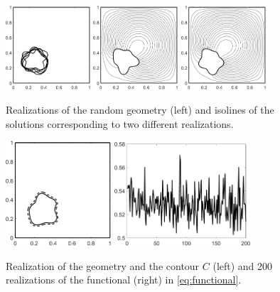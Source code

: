 \begin{figure}[!t]
	\centering
    \includegraphics[width=0.28\textwidth]{images/rand_geom}
    \;
    \includegraphics[width=0.28\textwidth]{images/realization1}
    \;
    \includegraphics[width=0.28\textwidth]{images/realization2}
	\caption{ Realizations of the random geometry (left) and isolines of the solutions corresponding to two different realizations.}
	\label{fig:rand_geom}
\end{figure}


\begin{figure}[!t]
	\centering
    \includegraphics[width=0.35\textwidth]{images/functional_contour}
    \qquad
    \includegraphics[width=0.45\textwidth]{images/functional}
	\caption{ Realization of the geometry and the contour $C$ (left) and 200 realizations of the functional (right) in \eqref{eq:functional}.}
	\label{fig:functional}
\end{figure}


